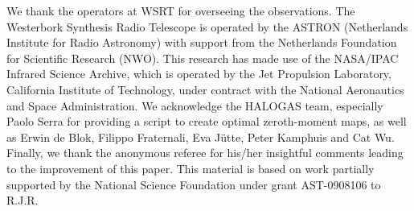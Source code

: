 \documentclass{emulateapj}
\begin{document}
\par 
     We thank the operators at WSRT for overseeing the observations.  The Westerbork Synthesis Radio Telescope is operated by the ASTRON (Netherlands Institute for Radio Astronomy) with support from the Netherlands Foundation for Scientific Research (NWO).  This research has made use of the NASA/IPAC Infrared Science Archive, which is operated by the Jet Propulsion Laboratory, California Institute of Technology, under contract with the National Aeronautics and Space Administration. We acknowledge the HALOGAS team, especially Paolo Serra for providing a script to create optimal zeroth-moment maps, as well as Erwin de Blok, Filippo Fraternali, Eva J\"{u}tte, Peter Kamphuis and Cat Wu.  Finally, we thank the anonymous referee for his/her insightful comments leading to the improvement of this paper. This material is based on work partially supported by the National Science Foundation under grant AST-0908106 to R.J.R. 




\nocite{2003ApJ...593..721M}
\nocite{2003AJ....125.2455U}
\nocite{1990IRASF.C......0M}
\nocite{1988ApJS...68...91R}
\nocite{2003AJ....126.1607S}
\nocite{1997ApJ...490..247L}
\end{document}

